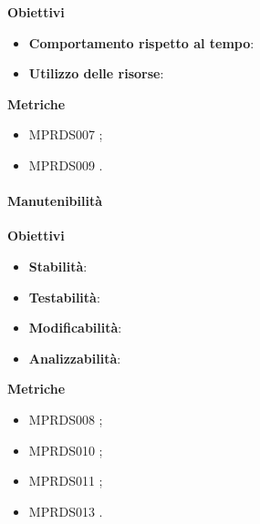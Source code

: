 \textbf{Obiettivi}
\begin{itemize}
\item \textbf{Comportamento rispetto al tempo}:
\item \textbf{Utilizzo delle risorse}:
\end{itemize}

\textbf{Metriche}
\begin{itemize}
\item MPRDS007 ;
\item  MPRDS009 .
\end{itemize}

\paragraph{Manutenibilità}

\textbf{Obiettivi}
\begin{itemize}
\item \textbf{Stabilità}:
\item \textbf{Testabilità}:
\item \textbf{Modificabilità}:
\item \textbf{Analizzabilità}:
\end{itemize}

\textbf{Metriche}
\begin{itemize}
\item MPRDS008 ;
\item MPRDS010 ;
\item MPRDS011 ;
\item MPRDS013 .
\end{itemize}